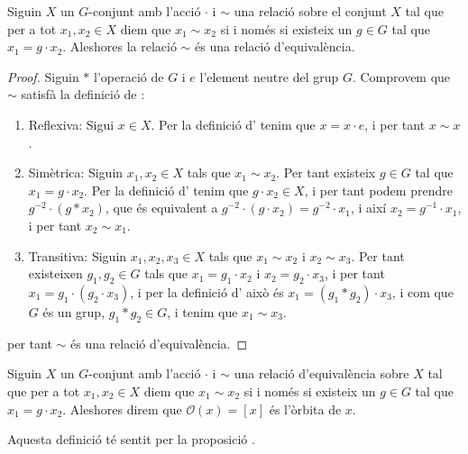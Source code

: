 \documentclass[../../Main.tex]{subfiles}
\begin{document}
	\begin{proposition}
		\label{prop:relacio d'òrbites és d'equivalència}
		Siguin \(X\) un \(G\)-conjunt amb l'acció \(\cdot\) i \(\sim\) una relació sobre el conjunt \(X\) tal que per a tot \(x_{1},x_{2}\in X\) diem que \(x_{1}\sim x_{2}\) si i només si existeix un \(g\in G\) tal que \(x_{1}=g\cdot x_{2}\). Aleshores la relació \(\sim\) és una relació d'equivalència.
		\begin{proof}
			Siguin \(\ast\) l'operació de \(G\) i \(e\) l'element neutre del grup \(G\). Comprovem que \(\sim\) satisfà la definició de :
			\begin{enumerate}
				\item Reflexiva: Sigui \(x\in X\). Per la definició d' tenim que \(x=x\cdot e\), i per tant \(x\sim x\).
				\item Simètrica: Siguin \(x_{1},x_{2}\in X\) tals que \(x_{1}\sim x_{2}\). Per tant existeix \(g\in G\) tal que \(x_{1}=g\cdot x_{2}\). Per la definició d' tenim que \(g\cdot x_{2}\in X\), i per tant podem prendre \(g^{-2}\cdot(g\ast x_{2})\), que és equivalent a \(g^{-2}\cdot(g\cdot x_{2})=g^{-2}\cdot x_{1}\), i així \(x_{2}=g^{-1}\cdot x_{1}\), i per tant \(x_{2}\sim x_{1}\).
				\item Transitiva: Siguin \(x_{1},x_{2},x_{3}\in X\) tals que \(x_{1}\sim x_{2}\) i \(x_{2}\sim x_{3}\). Per tant existeixen \(g_{1},g_{2}\in G\) tals que \(x_{1}=g_{1}\cdot x_{2}\) i \(x_{2}=g_{2}\cdot x_{3}\), i per tant \(x_{1}=g_{1}\cdot(g_{2}\cdot x_{3})\), i per la definició d' això és \(x_{1}=(g_{1}\ast g_{2})\cdot x_{3}\), i com que \(G\) és un grup, \(g_{1}\ast g_{2}\in G\), i tenim que \(x_{1}\sim x_{3}\).
			\end{enumerate}
			per tant \(\sim\) és una relació d'equivalència.
		\end{proof}
	\end{proposition}
	\begin{definition}
		\label{def:òrbita d'un element d'un G-conjunt}
		Siguin \(X\) un \(G\)-conjunt amb l'acció \(\cdot\) i \(\sim\) una relació d'equivalència sobre \(X\) tal que per a tot \(x_{1},x_{2}\in X\) diem que \(x_{1}\sim x_{2}\) si i només si existeix un \(g\in G\) tal que \(x_{1}=g\cdot x_{2}\). Aleshores direm que \(\mathcal{O}(x)=[x]\) és l'òrbita de \(x\).
		
		Aquesta definició té sentit per la proposició .
	\end{definition}
\end{document}
